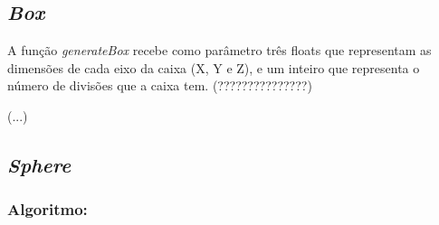 \documentclass[a4paper]{article}
\begin{document}
\newpage

\subsection{\textit{Box}}
\label{sec:box}
A função \textit{generateBox} recebe como parâmetro três floats que representam as dimensões de cada eixo da caixa (X, Y e Z), e um inteiro que representa o número de divisões que a caixa tem. (???????????????)

(...)

\subsection{\textit{Sphere}}
\label{sec:sphere}

\subsubsection{Algoritmo:}
\end{document}
